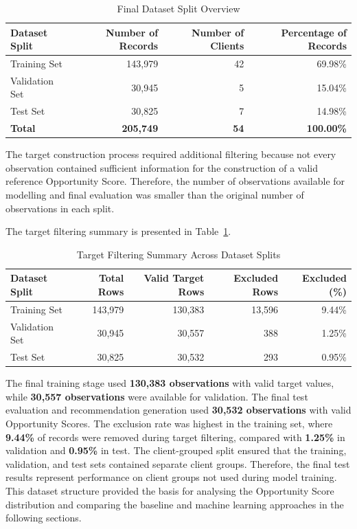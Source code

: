 \documentclass[12pt,a4paper]{report}
\begin{document}
\begin{table}[htbp]
\centering
\caption{Final Dataset Split Overview}

\begin{tabular}{|l|r|r|r|}
\hline
\textbf{Dataset Split} & \textbf{Number of Records} & \textbf{Number of Clients} & \textbf{Percentage of Records} \\
\hline
Training Set & 143,979 & 42 & 69.98\% \\
\hline
Validation Set & 30,945 & 5 & 15.04\% \\
\hline
Test Set & 30,825 & 7 & 14.98\% \\
\hline
\textbf{Total} & \textbf{205,749} & \textbf{54} & \textbf{100.00\%} \\
\hline
\end{tabular}
\end{table}

The target construction process required additional filtering because not every observation contained sufficient information for the construction of a valid reference Opportunity Score. Therefore, the number of observations available for modelling and final evaluation was smaller than the original number of observations in each split.

The target filtering summary is presented in Table~\ref{tab:target_filtering_summary}.

\begin{table}[htbp]
\centering
\caption{Target Filtering Summary Across Dataset Splits}
\label{tab:target_filtering_summary}
\begin{tabular}{|l|r|r|r|r|}
\hline
\textbf{Dataset Split} & \textbf{Total Rows} & \textbf{Valid Target Rows} & \textbf{Excluded Rows} & \textbf{Excluded (\%)} \\
\hline
Training Set & 143,979 & 130,383 & 13,596 & 9.44\% \\
\hline
Validation Set & 30,945 & 30,557 & 388 & 1.25\% \\
\hline
Test Set & 30,825 & 30,532 & 293 & 0.95\% \\
\hline
\end{tabular}
\end{table}

The final training stage used \textbf{130,383 observations} with valid target values, while \textbf{30,557 observations} were available for validation. The final test evaluation and recommendation generation used \textbf{30,532 observations} with valid Opportunity Scores. The exclusion rate was highest in the training set, where \textbf{9.44\%} of records were removed during target filtering, compared with \textbf{1.25\%} in validation and \textbf{0.95\%} in test. The client-grouped split ensured that the training, validation, and test sets contained separate client groups. Therefore, the final test results represent performance on client groups not used during model training. This dataset structure provided the basis for analysing the Opportunity Score distribution and comparing the baseline and machine learning approaches in the following sections.
\end{document}
